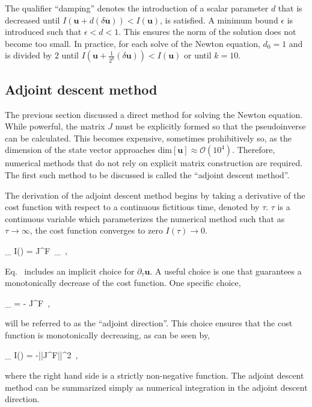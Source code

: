 The qualifier ``damping'' denotes the introduction of a scalar parameter $d$ that is
decreased until $I(\mathbf{u} + d(\delta \mathbf{u})) < I(\mathbf{u})$, is satisfied. A minimum bound $\epsilon$
is introduced such that  $\epsilon < d < 1$. This ensures the norm of the solution does not become too small.
In practice, for each solve of the Newton equation,
$d_0 = 1$ and is divided by $2$ until  $I(\mathbf{u} + \frac{1}{2^k}(\delta \mathbf{u})) < I(\mathbf{u})$ or until
$k=10$.

\subsection{Adjoint descent method}
\label{subsection:adjoint}
The previous section discussed a direct method for solving the Newton equation. While powerful,
the matrix $J$ must be explicitly formed so that the pseudoinverse can be calculated. This becomes expensive, sometimes prohibitively so,
as the dimension of the state vector approaches $\text{dim}[\mathbf{{u}}] \approx \mathcal{O}(10^4)$.
Therefore, numerical methods that do not rely on explicit matrix construction are required.
The first such method to be discussed is called the ``adjoint descent method''.

The derivation of the adjoint descent method begins by taking a
derivative of the cost function  with respect to
a continuous fictitious time, denoted by $\tau$. $\tau$ is a continuous variable which
parameterizes the numerical method such that
as $\tau \rightarrow \infty$, the cost function converges to zero $I(\tau) \rightarrow 0$.

\beq
\partial_{\tau} I() = J^{\top}F \,\partial_{\tau}
\,,

Eq.~ includes an implicit choice for $\partial_{\tau}\mathbf{u}$.
A useful choice is one that guarantees a monotonically decrease of the cost
function. One specific choice,

\beq
\partial_{\tau} = - J^{\top}F
\,,

will be referred to as the ``adjoint direction''. This choice ensures that the cost function
is monotonically decreasing, as can be seen by,

\beq
\partial_{\tau} I() = -||J^{\top}F||^2
\,,

where the right hand side is a strictly non-negative function.
The adjoint descent method can be summarized
simply as numerical integration in the adjoint descent direction.


